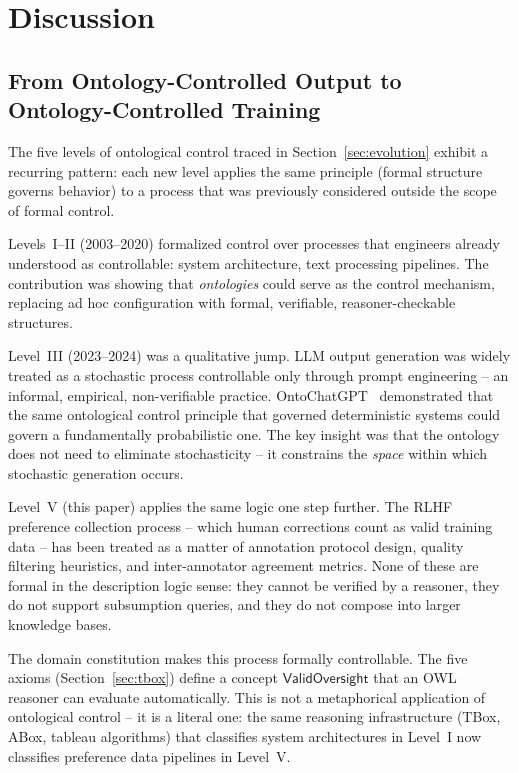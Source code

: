 \documentclass[11pt]{article}
\begin{document}
\section{Discussion}
\label{sec:discussion}

\subsection{From Ontology-Controlled Output to Ontology-Controlled Training}
\label{sec:disc-output-to-training}

The five levels of ontological control traced in Section~\ref{sec:evolution} exhibit a recurring pattern: each new level applies the same principle (formal structure governs behavior) to a process that was previously considered outside the scope of formal control.

Levels~I--II (2003--2020) formalized control over processes that engineers already understood as controllable: system architecture, text processing pipelines.
The contribution was showing that \emph{ontologies} could serve as the control mechanism, replacing ad hoc configuration with formal, verifiable, reasoner-checkable structures.

Level~III (2023--2024) was a qualitative jump.
LLM output generation was widely treated as a stochastic process controllable only through prompt engineering -- an informal, empirical, non-verifiable practice.
OntoChatGPT~\citep{palagin2023ontochatgpt} demonstrated that the same ontological control principle that governed deterministic systems could govern a fundamentally probabilistic one.
The key insight was that the ontology does not need to eliminate stochasticity -- it constrains the \emph{space} within which stochastic generation occurs.

Level~V (this paper) applies the same logic one step further.
The RLHF preference collection process -- which human corrections count as valid training data -- has been treated as a matter of annotation protocol design, quality filtering heuristics, and inter-annotator agreement metrics.
None of these are formal in the description logic sense: they cannot be verified by a reasoner, they do not support subsumption queries, and they do not compose into larger knowledge bases.

The domain constitution makes this process formally controllable.
The five axioms (Section~\ref{sec:tbox}) define a concept $\mathsf{ValidOversight}$ that an OWL reasoner can evaluate automatically.
This is not a metaphorical application of ontological control -- it is a literal one: the same reasoning infrastructure (TBox, ABox, tableau algorithms) that classifies system architectures in Level~I now classifies preference data pipelines in Level~V.
\end{document}
